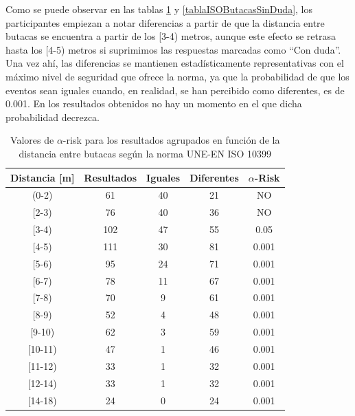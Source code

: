 \documentclass[11pt,a4paper,twoside]{book}
\begin{document}
            Como se puede observar en las tablas \ref{tablaISOButacasDuda} y \ref{tablaISOButacasSinDuda}, los participantes empiezan a notar diferencias a partir de que la distancia entre butacas se encuentra a partir de los [3-4) metros, aunque este efecto se retrasa hasta los [4-5) metros si suprimimos las respuestas marcadas como ``Con duda''. Una vez ahí, las diferencias se mantienen estadísticamente representativas con el máximo nivel de seguridad que ofrece la norma, ya que la probabilidad de que los eventos sean iguales cuando, en realidad, se han percibido como diferentes, es de 0.001. En los resultados obtenidos no hay un momento en el que dicha probabilidad decrezca.\newline
            
            \begin{table}
			\begin{center}
			\begin{scriptsize}
			\begin{tabular}{| c | c | c | c || c |}
			    \hline
				\textbf{Distancia [m]}&\textbf{Resultados}&\textbf{Iguales}&\textbf{Diferentes}&\textbf{$\alpha$-Risk}\\ \hline
                (0-2)&61&40&21&NO\\ \hline
                [2-3)&76&40&36&NO\\ \hline
                [3-4)&102&47&55&0.05\\ \hline
                [4-5)&111&30&81&0.001\\ \hline
                [5-6)&95&24&71&0.001\\ \hline
                [6-7)&78&11&67&0.001\\ \hline
                [7-8)&70&9&61&0.001\\ \hline
                [8-9)&52&4&48&0.001\\ \hline
                [9-10)&62&3&59&0.001\\ \hline
                [10-11)&47&1&46&0.001\\ \hline
                [11-12)&33&1&32&0.001\\ \hline
                [12-14)&33&1&32&0.001\\ \hline
                [14-18)&24&0&24&0.001\\ \hline
			\end{tabular}
			\caption{Valores de $\alpha$-risk para los resultados agrupados en función de la distancia entre butacas según la norma UNE-EN ISO 10399}
			\label{tablaISOButacasDuda}
			\end{scriptsize}
			\end{center}	
		    \end{table}
		    
\end{document}
